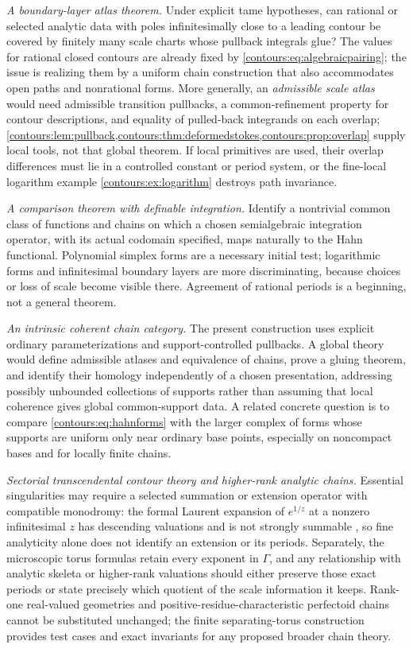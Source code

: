 \documentclass[11pt,letterpaper]{article}
\theoremstyle{definition}
\theoremstyle{remark}
\numberwithin{equation}{section}
\begin{document}
\emph{A boundary-layer atlas theorem.} Under explicit tame hypotheses, can rational
or selected analytic data with poles infinitesimally close to a leading contour be
covered by finitely many scale charts whose pullback integrals glue? The values for
rational closed contours are already fixed by
\eqref{contours:eq:algebraicpairing}; the issue is realizing them by a uniform chain
construction that also accommodates open paths and nonrational forms. More
generally, an \emph{admissible scale atlas} would need admissible transition
pullbacks, a common-refinement property for contour descriptions, and equality of
pulled-back integrands on each overlap; \cref{contours:lem:pullback,contours:thm:deformedstokes,contours:prop:overlap} supply local tools, not that
global theorem. If local primitives are used, their overlap differences must lie in a
controlled constant or period system, or the fine-local logarithm example
\cref{contours:ex:logarithm} destroys path invariance.

\emph{A comparison theorem with definable integration.} Identify a nontrivial common
class of functions and chains on which a chosen semialgebraic integration operator,
with its actual codomain specified, maps naturally to the Hahn functional. Polynomial
simplex forms are a necessary initial test; logarithmic forms and infinitesimal
boundary layers are more discriminating, because choices or loss of scale become
visible there. Agreement of rational periods is a beginning, not a general theorem.

\emph{An intrinsic coherent chain category.} The present construction uses explicit
ordinary parameterizations and support-controlled pullbacks. A global theory would
define admissible atlases and equivalence of chains, prove a gluing theorem, and
identify their homology independently of a chosen presentation, addressing possibly
unbounded collections of supports rather than assuming that local coherence gives
global common-support data. A related concrete question is to compare
\eqref{contours:eq:hahnforms} with the larger complex of forms whose supports are
uniform only near ordinary base points, especially on noncompact bases and for
locally finite chains.

\emph{Sectorial transcendental contour theory and higher-rank analytic chains.}
Essential singularities may require a selected summation or extension operator with
compatible monodromy: the formal Laurent expansion of $e^{1/z}$ at a nonzero
infinitesimal $z$ has descending valuations and is not strongly summable
\cite[\S13]{Analysis}, so fine analyticity alone does not identify an extension or
its periods. Separately, the microscopic torus formulas retain every exponent in
$\Gamma$, and any relationship with analytic skeleta or higher-rank valuations should
either preserve those exact periods or state precisely which quotient of the scale
information it keeps. Rank-one real-valued geometries and
positive-residue-characteristic perfectoid chains cannot be substituted unchanged;
the finite separating-torus construction provides test cases and exact invariants for
any proposed broader chain theory.
\end{document}
